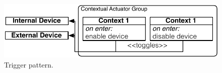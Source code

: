 \begin{figure}
\begin{center}
\includegraphics[scale=.5]{imgs/con_act}
\vspace{-1mm}
\caption{Trigger pattern.}
  \label{fig:trigger}
\vspace{-8mm}
\end{center}
\end{figure}

